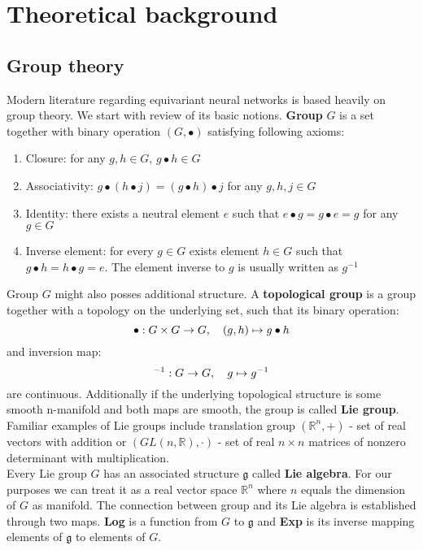 \section{Theoretical background}

\subsection{Group theory}
    Modern literature regarding equivariant neural networks is based heavily on
    group theory. We start with review of its basic notions.
    \textbf{Group} $G$ is a set together with binary operation $\left(G, \bullet \right)$ satisfying
    following axioms:
    \begin{enumerate}
        \item Closure: for any $g, h \in G$, $g \bullet h \in G$
        \item Associativity:  $g\bullet \left(h \bullet j \right) =
                    \left(g \bullet h \right) \bullet j$ for any $g,h,j \in G$
        \item Identity: there exists a neutral element $e$ such that
                $e \bullet g = g \bullet e = g$ for any $g \in G$
        \item Inverse element: for every $g \in G$ exists element $h \in G$ such that
                $g \bullet h = h\bullet g = e$. The element inverse to $g$ is usually
                written as $g^{-1}$
    \end{enumerate}
    \par Group $G$ might also posses additional structure. A \textbf{topological group}
        is a group together with a topology on the underlying set,
        such that its binary operation:\\
        $$\bullet: G \times G \to G, \hspace*{1em} \left(g,h \right) \mapsto g\bullet h$$
        and inversion map: \\
        $${}^{-1}: G \to G, \hspace*{1em} g \mapsto g^{-1}$$
        are continuous. Additionally if the underlying topological structure
        is some smooth n-manifold and both maps are smooth, the group is called
        \textbf{Lie group}. Familiar examples of Lie groups include translation group
        $\left( \mathbb{R}^n, + \right)$ - set of real vectors with addition or
        $\left(GL(n,\mathbb{R}), \cdot \right)$ - set of real $n \times n$ matrices of nonzero determinant
        with multiplication.\\
        Every Lie group $G$ has an associated structure $\mathfrak{g}$ called \textbf{Lie
        algebra}. For our purposes we can treat it as a real vector space
        $\mathbb{R}^n$ where $n$ equals the dimension of $G$ as manifold. The
        connection between group and its Lie algebra is established through two
        maps. \textbf{Log} is a function from $G$ to $\mathfrak{g}$ and \textbf{Exp}
        is its inverse
        mapping elements of $\mathfrak{g}$ to elements of $G$.


